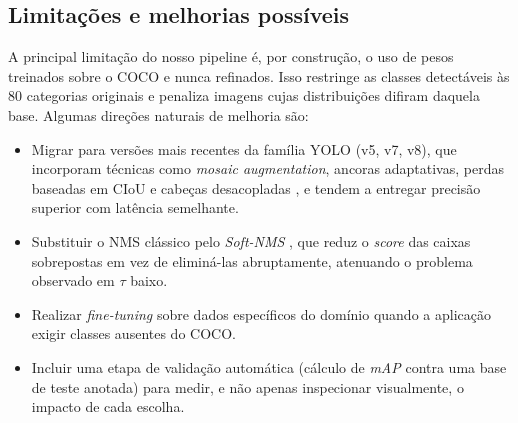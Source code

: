 \documentclass[11pt,a4paper]{article}
\begin{document}
\subsection{Limitações e melhorias possíveis}

A principal limitação do nosso pipeline é, por construção, o uso de pesos treinados sobre o COCO e nunca refinados. Isso restringe as classes detectáveis às 80 categorias originais e penaliza imagens cujas distribuições difiram daquela base. Algumas direções naturais de melhoria são:

\begin{itemize}\itemsep0pt
  \item Migrar para versões mais recentes da família YOLO (v5, v7, v8), que incorporam técnicas como \emph{mosaic augmentation}, ancoras adaptativas, perdas baseadas em CIoU e cabeças desacopladas \cite{bochkovskiy2020yolov4,jocher2020yolov5}, e tendem a entregar precisão superior com latência semelhante.
  \item Substituir o NMS clássico pelo \emph{Soft-NMS} \cite{bodla2017softnms}, que reduz o \emph{score} das caixas sobrepostas em vez de eliminá-las abruptamente, atenuando o problema observado em $\tau$ baixo.
  \item Realizar \emph{fine-tuning} sobre dados específicos do domínio quando a aplicação exigir classes ausentes do COCO.
  \item Incluir uma etapa de validação automática (cálculo de \emph{mAP} contra uma base de teste anotada) para medir, e não apenas inspecionar visualmente, o impacto de cada escolha.
\end{itemize}

\end{document}
